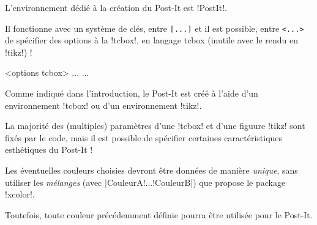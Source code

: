 \documentclass[french,a4paper,11pt]{article}
\begin{document}
\begin{cautionblock}
L'environnement dédié à la création du Post-It est \packagetex!PostIt!.

Il fonctionne avec un système de clés, entre \texttt{[...]} et il est possible, entre \texttt{<...>} de spécifier des options à la \motcletex!tcbox!, en langage \textsf{tcbox} (inutile avec le rendu en \motcletex!tikz!) !
\end{cautionblock}

\begin{DemoCode}
\begin{PostIt}[clés]<options tcbox>
...
...
\end{PostIt}
\end{DemoCode}

\begin{noteblock}
Comme indiqué dans l'introduction, le Post-It est créé à l'aide d'un environnement \motcletex!tcbox! ou d'un environnement \motcletex!tikz!.

La majorité des (multiples) paramètres d'une \motcletex!tcbox! et d'une figuure \motcletex!tikz! sont fixés par le code, mais il est possible de spécifier certaines caractéristiques esthétiques du Post-It !
\end{noteblock}

\begin{DemoCode}[]
\begin{PostIt}
\lipsum[1][1-2]
\end{PostIt}
\end{DemoCode}

\begin{DemoCode}[]
\begin{PostIt}[Rendu=tikz]
	\lipsum[1][1-2]
\end{PostIt}
\begin{PostIt}[Rendu=tikzv2]
	\lipsum[1][1-2]
\end{PostIt}
\end{DemoCode}

\begin{tipblock}
Les éventuelles couleurs choisies devront être données de manière \textit{unique}, sans utiliser les \textit{mélanges} (avec \motcletex|CouleurA!...!CouleurB|) que propose le package \packagetex!xcolor!.

Toutefois, toute couleur précédemment définie pourra être utilisée pour le Post-It.
\end{tipblock}
\end{document}
